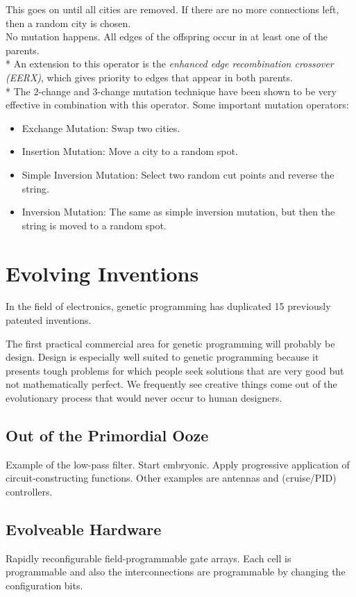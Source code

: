 \documentclass[12pt]{book}
\begin{document}
\begin{itemize}
\begin{itemize}
\end{itemize}
This goes on until all cities are removed. If there are no more connections left, then a random city is chosen.\\
No mutation happens. All edges of the offspring occur in at least one of the parents.\\*
An extension to this operator is the \textit{enhanced edge recombination crossover (EERX)}, which gives priority to edges that appear in both parents.\\*
The $2$-change and $3$-change mutation technique have been shown to be very effective in combination with this operator. Some important mutation operators:
\begin{itemize}
\item Exchange Mutation: Swap two cities.
\item Insertion Mutation: Move a city to a random spot.
\item Simple Inversion Mutation: Select two random cut points and reverse the string.
\item Inversion Mutation: The same as simple inversion mutation, but then the string is moved to a random spot.
\end{itemize}
\end{itemize}
\clearpage

\appendix
\chapter{Evolving Inventions}
In the field of electronics, genetic programming has duplicated 15 previously patented inventions.

The first practical commercial area for genetic programming will probably be design. Design is especially well suited to genetic programming because it presents tough problems for which people seek solutions that are very good but not mathematically perfect. We frequently see creative things come out of the evolutionary process that would never occur to human designers.

\section{Out of the Primordial Ooze}
Example of the low-pass filter. Start embryonic. Apply progressive application of circuit-constructing functions. Other examples are antennas and (cruise/PID) controllers.

\section{Evolveable Hardware}
Rapidly reconfigurable field-programmable gate arrays. Each cell is programmable and also the interconnections are programmable by changing the configuration bits.
\end{document}
